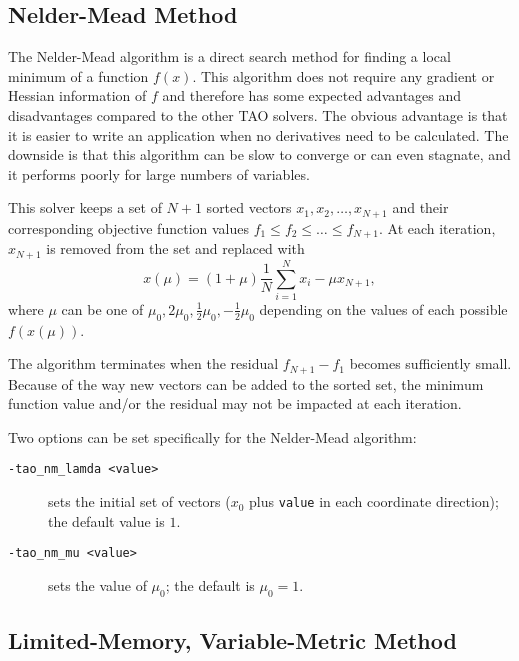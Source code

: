\subsection{Nelder-Mead Method}
The Nelder-Mead algorithm \cite{nelder.mead:simplex} is a direct search method for finding a local
minimum of a function $f(x)$.  This algorithm does not require any gradient or Hessian 
information of $f$ and therefore has some expected advantages and disadvantages compared
to the other TAO solvers.  The obvious advantage is that it is easier to write an 
application when no derivatives need to be calculated.  The downside is that this algorithm can
be slow to converge or can even stagnate, and it performs poorly for large numbers of variables.

This solver keeps a set of $N+1$ sorted vectors ${x_1,x_2,\ldots,x_{N+1}}$ and their corresponding 
objective function values $f_1 \leq f_2 \leq \ldots \leq f_{N+1}$.  At each iteration, $x_{N+1}$ is removed from
the set and replaced with 
\[
x(\mu) = (1+\mu) \frac{1}{N} \sum_{i=1}^N x_i - \mu x_{N+1},
\]
where $\mu$ can be one of
${\mu_0,2\mu_0,\frac{1}{2}\mu_0,-\frac{1}{2}\mu_0}$ depending on the
values of 
each possible $f(x(\mu))$.

The algorithm terminates when the residual  $f_{N+1} - f_1$ becomes sufficiently small.  Because of 
the way new vectors can be added to the sorted set, 
the minimum function value and/or the residual may not be impacted at each iteration.

Two options can be set specifically for the Nelder-Mead algorithm:
\begin{description}
\item[\tt -tao\_nm\_lamda <value>] sets the initial set of vectors ($x_0$ plus 
{\tt value} in each coordinate direction); the default value is $1$.  
\item[\tt -tao\_nm\_mu <value>] sets the value of $\mu_0$; the default 
is $\mu_0=1$.
\end{description}

\subsection{Limited-Memory, Variable-Metric Method}

